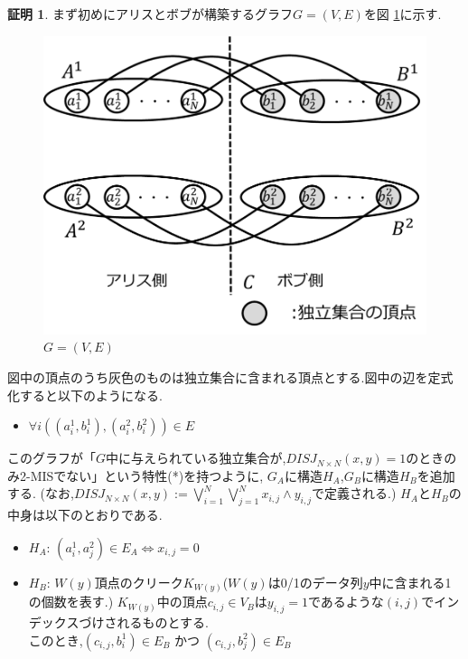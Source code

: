 \documentclass[12pt]{thesis}
\theoremstyle{definition}
\newtheorem*{prf*}{証明}
\begin{document}
\begin{prf*}
まず初めにアリスとボブが構築するグラフ$G = (V, E)$を図 \ref{2_G}に示す. 

\begin{figure}[ht]
\begin{center}
\includegraphics[width=120mm]{2_G.png}
\end{center}
\caption{$G = (V, E)$}
\label{2_G}
\end{figure}

図中の頂点のうち灰色のものは独立集合に含まれる頂点とする.図中の辺を定式化すると以下のようになる.
\begin{itemize}
\item $\forall i((a_{i}^{1}, b_{i}^{1}), (a_{i}^{2}, b_{i}^{2})) \in E$
\end{itemize}

このグラフが「$G$中に与えられている独立集合が,$DISJ_{N \times N} (x, y) = 1$のときのみ2-MISでない」という特性(*)を持つように,
$G_{A}$に構造$H_{A}$,$G_{B}$に構造$H_{B}$を追加する.
(なお,$DISJ_{N \times N} (x, y) :=\bigvee_{i = 1}^{N} \bigvee_{j = 1}^{N} x_{i, j} \land y_{i, j}$で定義される.)
$H_{A}$と$H_{B}$の中身は以下のとおりである.

\newpage
\begin{itemize}
\item $H_{A}$: $(a_{i}^{1}, a_{j}^{2}) \in E_{A} \Leftrightarrow x_{i, j} = 0$
\item $H_{B}$: $W(y)$頂点のクリーク$K_{W(y)}$($W(y)$は0/1のデータ列$y$中に含まれる1の個数を表す.)
$K_{W(y)}$中の頂点$c_{i, j} \in V_{B}$は$y_{i, j} = 1$であるような$(i, j)$でインデックスづけされるものとする. \\
このとき,$(c_{i, j}, b_{i}^{1}) \in E_{B}$ かつ $(c_{i, j}, b_{j}^{2}) \in E_{B}$
\end{itemize}


\end{prf*}
\end{document}
